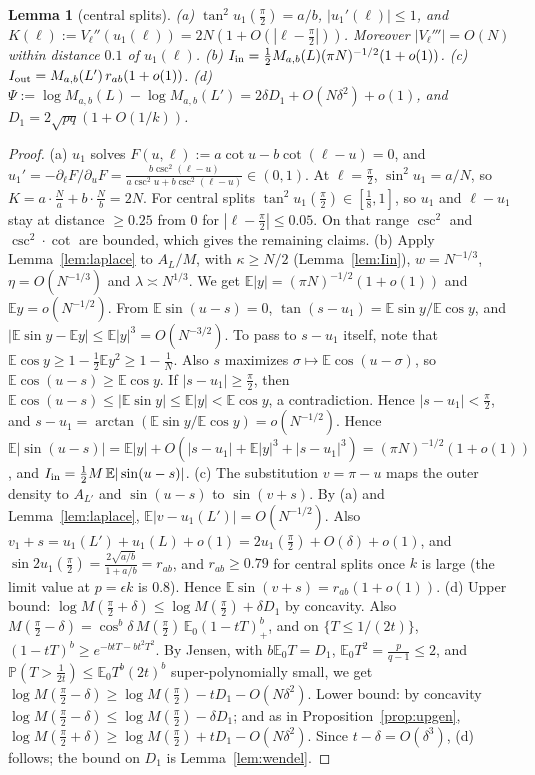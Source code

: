 \documentclass[11pt]{amsart}
\newtheorem{lemma}[theorem]{Lemma}
\theoremstyle{definition}
\begin{document}
\begin{lemma}[central splits]\label{lem:central}
(a) $\tan^2u_1(\frac\pi2)=a/b$, $|u_1'(\ell)|\le1$, and $K(\ell):=V_\ell''(u_1(\ell))=2N(1+O(|\ell-\frac\pi2|))$. Moreover $|V_\ell'''|=O(N)$ within distance $0.1$ of $u_1(\ell)$.
(b) $I_{\rm in}=\frac12M_{a,b}(L)(\pi N)^{-1/2}(1+o(1))$.
(c) $I_{\rm out}=M_{a,b}(L')\,r_{ab}(1+o(1))$.
(d) $\Psi:=\log M_{a,b}(L)-\log M_{a,b}(L')=2\delta D_1+O(N\delta^2)+o(1)$, and $D_1=2\sqrt{pq}(1+O(1/k))$.
\end{lemma}
\begin{proof}
(a) $u_1$ solves $F(u,\ell):=a\cot u-b\cot(\ell-u)=0$, and $u_1'=-\partial_\ell F/\partial_uF=\frac{b\csc^2(\ell-u)}{a\csc^2u+b\csc^2(\ell-u)}\in(0,1)$.
At $\ell=\frac\pi2$, $\sin^2u_1=a/N$, so $K=a\cdot\frac Na+b\cdot\frac Nb=2N$. For central splits $\tan^2u_1(\frac\pi2)\in[\frac18,1]$, so
$u_1$ and $\ell-u_1$ stay at distance $\ge0.25$ from $0$ for $|\ell-\frac\pi2|\le0.05$. On that range $\csc^2$ and $\csc^2\cdot\cot$ are
bounded, which gives the remaining claims.
(b) Apply Lemma~\ref{lem:laplace} to $A_L/M$, with $\kappa\ge N/2$ (Lemma~\ref{lem:Iin}), $w=N^{-1/3}$, $\eta=O(N^{-1/3})$ and
$\lambda\asymp N^{1/3}$. We get $\mathbb E|y|=(\pi N)^{-1/2}(1+o(1))$ and $\mathbb Ey=o(N^{-1/2})$. From $\mathbb E\sin(u-s)=0$,
$\tan(s-u_1)=\mathbb E\sin y/\mathbb E\cos y$, and $|\mathbb E\sin y-\mathbb Ey|\le\mathbb E|y|^3=O(N^{-3/2})$. To pass to $s-u_1$ itself,
note that $\mathbb E\cos y\ge1-\frac12\mathbb Ey^2\ge1-\frac1N$. Also $s$ maximizes $\sigma\mapsto\mathbb E\cos(u-\sigma)$, so
$\mathbb E\cos(u-s)\ge\mathbb E\cos y$. If $|s-u_1|\ge\frac\pi2$, then $\mathbb E\cos(u-s)\le|\mathbb E\sin y|\le\mathbb E|y|<\mathbb E\cos y$, a contradiction.
Hence $|s-u_1|<\frac\pi2$, and $s-u_1=\arctan(\mathbb E\sin y/\mathbb E\cos y)=o(N^{-1/2})$.
Hence $\mathbb E|\sin(u-s)|=\mathbb E|y|+O(|s-u_1|+\mathbb E|y|^3+|s-u_1|^3)=(\pi N)^{-1/2}(1+o(1))$, and
$I_{\rm in}=\frac12M\,\mathbb E|\sin(u-s)|$.
(c) The substitution $v=\pi-u$ maps the outer density to $A_{L'}$ and $\sin(u-s)$ to $\sin(v+s)$. By (a) and Lemma~\ref{lem:laplace},
$\mathbb E|v-u_1(L')|=O(N^{-1/2})$. Also $v_1+s=u_1(L')+u_1(L)+o(1)=2u_1(\frac\pi2)+O(\delta)+o(1)$, and
$\sin2u_1(\frac\pi2)=\frac{2\sqrt{a/b}}{1+a/b}=r_{ab}$, and $r_{ab}\ge0.79$ for central splits once $k$ is large (the limit value at
$p=\epsilon k$ is $0.8$). Hence $\mathbb E\sin(v+s)=r_{ab}(1+o(1))$.
(d) Upper bound: $\log M(\frac\pi2+\delta)\le\log M(\frac\pi2)+\delta D_1$ by concavity. Also $M(\frac\pi2-\delta)=\cos^b\delta\,M(\frac\pi2)\,\mathbb E_0(1-tT)_+^b$,
and on $\{T\le1/(2t)\}$, $(1-tT)^b\ge e^{-btT-bt^2T^2}$. By Jensen, with $b\mathbb E_0T=D_1$, $\mathbb E_0T^2=\frac p{q-1}\le2$, and
$\mathbb P(T>\frac1{2t})\le\mathbb E_0T^{b}(2t)^{b}$ super-polynomially small, we get
$\log M(\frac\pi2-\delta)\ge\log M(\frac\pi2)-tD_1-O(N\delta^2)$. Lower bound: by concavity
$\log M(\frac\pi2-\delta)\le\log M(\frac\pi2)-\delta D_1$; and as in Proposition~\ref{prop:upgen},
$\log M(\frac\pi2+\delta)\ge\log M(\frac\pi2)+tD_1-O(N\delta^2)$. Since $t-\delta=O(\delta^3)$, (d) follows; the bound on $D_1$ is Lemma~\ref{lem:wendel}.
\end{proof}
\end{document}
